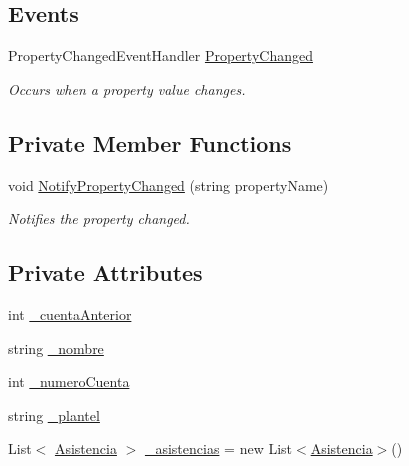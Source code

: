 \subsection*{Events}
\begin{DoxyCompactItemize}
\item 
Property\-Changed\-Event\-Handler \hyperlink{class_asistencias__wpf_1_1_asistente_a1d1bb982d69d545e282360e1d0b57472}{Property\-Changed}
\begin{DoxyCompactList}\small\item\em Occurs when a property value changes. \end{DoxyCompactList}\end{DoxyCompactItemize}
\subsection*{Private Member Functions}
\begin{DoxyCompactItemize}
\item 
void \hyperlink{class_asistencias__wpf_1_1_asistente_a068f2f3fa2becbec4444bda3575c89f9}{Notify\-Property\-Changed} (string property\-Name)
\begin{DoxyCompactList}\small\item\em Notifies the property changed. \end{DoxyCompactList}\end{DoxyCompactItemize}
\subsection*{Private Attributes}
\begin{DoxyCompactItemize}
\item 
int \hyperlink{class_asistencias__wpf_1_1_asistente_aafb8d9bcc27f0e6d1b5b7a24bfc84893}{\-\_\-cuenta\-Anterior}
\item 
string \hyperlink{class_asistencias__wpf_1_1_asistente_a0550570e3668c5b155fda7b5ca5a4484}{\-\_\-nombre}
\item 
int \hyperlink{class_asistencias__wpf_1_1_asistente_a7575bb2865cc410870a063630527e992}{\-\_\-numero\-Cuenta}
\item 
string \hyperlink{class_asistencias__wpf_1_1_asistente_a8b6ed5864317a033ade72dfa8b9dc0f9}{\-\_\-plantel}
\item 
List$<$ \hyperlink{class_asistencias__wpf_1_1_asistencia}{Asistencia} $>$ \hyperlink{class_asistencias__wpf_1_1_asistente_a4496f6ac3f13327513b2d54b7e8c9de8}{\-\_\-asistencias} = new List$<$\hyperlink{class_asistencias__wpf_1_1_asistencia}{Asistencia}$>$()
\end{DoxyCompactItemize}


